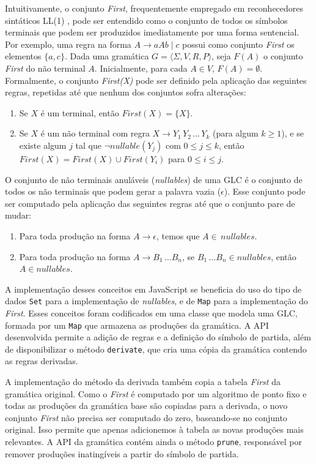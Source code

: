 Intuitivamente, o conjunto \emph{First}, frequentemente empregado em reconhecedores sintáticos LL(1) \cite{Aho2006}, pode ser entendido como o conjunto de todos os símbolos terminais que podem ser produzidos imediatamente por uma forma sentencial. Por exemplo, uma regra na forma $A \to aAb \;|\; c$ possui como conjunto \emph{First} os elementos $\{a,c\}$. Dada uma gramática $G = \langle \Sigma, V, R, P \rangle$, seja $F(A)$ o conjunto \emph{First} do não terminal $A$. Inicialmente, para cada $A \in V$, $F(A) = \emptyset$. Formalmente, o conjunto \emph{First(X)} pode ser definido pela aplicação das seguintes regras, repetidas até que nenhum dos conjuntos sofra alterações:

  \begin{enumerate}
   \item Se $X$ é um terminal, então $First(X) = \{X\}$.
   \item Se $X$ é um não terminal com regra $X \to Y_1\,Y_2\,\ldots\,Y_k$ (para algum $k \geq 1$), e se existe algum $j$ tal que $\neg nullable(Y_j)$ com $0 \leq j \leq k$, então $First(X) = First(X) \cup First(Y_i)$ para $0 \leq i \leq j$.
  \end{enumerate}

O conjunto de não terminais anuláveis (\emph{nullables}) de uma GLC é o conjunto de todos os não terminais que podem gerar a palavra vazia ($\epsilon$). Esse conjunto pode ser computado pela aplicação das seguintes regras até que o conjunto pare de mudar:

  \begin{enumerate}
     \item Para toda produção na forma $A \to \epsilon$, temos que $A \in \,nullables$.
     \item Para toda produção na forma $A \to B_1\,\ldots B_n$, se $B_1\,\ldots B_n \in nullables$, então $A \in nullables$.
  \end{enumerate}

A implementação desses conceitos em JavaScript se beneficia do uso do tipo de dados \texttt{Set} para a implementação de \emph{nullables}, e de \texttt{Map} para a implementação do \emph{First}. Esses conceitos foram codificados em uma classe que modela uma GLC, formada por um \texttt{Map} que armazena as produções da gramática. A API desenvolvida permite a adição de regras e a definição do símbolo de partida, além de disponibilizar o método \texttt{derivate}, que cria uma cópia da gramática contendo as regras derivadas.

A implementação do método da derivada também copia a tabela \emph{First} da gramática original. Como o \emph{First} é computado por um algoritmo de ponto fixo e todas as produções da gramática base são copiadas para a derivada, o novo conjunto \emph{First} não precisa ser computado do zero, baseando-se no conjunto original. Isso permite que apenas adicionemos à tabela as novas produções mais relevantes. A API da gramática contém ainda o método \texttt{prune}, responsável por remover produções inatingíveis a partir do símbolo de partida.

